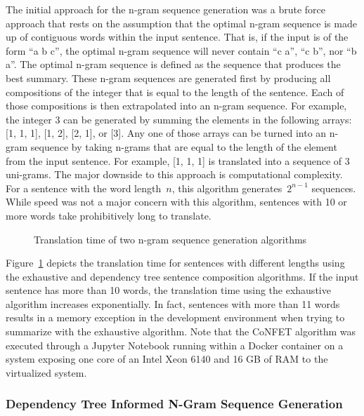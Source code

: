 \documentclass{article}[10]
\begin{document}
The initial approach for the n-gram sequence generation was a brute force approach that rests on the assumption that the optimal n-gram sequence is made up of contiguous words within the input sentence. That is, if the input is of the form ``a b c'', the optimal n-gram sequence will never contain ``c a'', ``c b'', nor ``b a''. The optimal n-gram sequence is defined as the sequence that produces the best summary. These n-gram sequences are generated first by producing all compositions of the integer that is equal to the length of the sentence. Each of those compositions is then extrapolated into an n-gram sequence. For example, the integer 3 can be generated by summing the elements in the following arrays: [1, 1, 1], [1, 2], [2, 1], or [3]. Any one of those arrays can be turned into an n-gram sequence by taking n-grams that are equal to the length of the element from the input sentence. For example, [1, 1, 1] is translated into a sequence of 3 uni-grams. The major downside to this approach is computational complexity. For a sentence with the word length~\(n\), this algorithm generates~\(2^{n-1}\) sequences. While speed was not a major concern with this algorithm, sentences with 10 or more words take prohibitively long to translate.

\begin{figure}[H]
  \begin{center}
    \scalebox{0.6}{}
    \caption{Translation time of two n-gram sequence generation
      algorithms\label{fig:timing}}
  \end{center}
\end{figure}

Figure~\ref{fig:timing} depicts the translation time for sentences with different lengths using the exhaustive and dependency tree sentence composition algorithms. If the input sentence has more than 10 words, the translation time using the exhaustive algorithm increases exponentially. In fact, sentences with more than 11 words results in a memory exception in the development environment when trying to summarize with the exhaustive algorithm. Note that the CoNFET algorithm was executed through a Jupyter Notebook running within a Docker container on a system exposing one core of an Intel Xeon 6140 and 16 GB of RAM to the virtualized system.

\subsubsection{Dependency Tree Informed N-Gram Sequence Generation\label{sec:dependency}}
\end{document}

